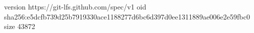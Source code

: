version https://git-lfs.github.com/spec/v1
oid sha256:e5dcfb739d25b7919330ace1188277d6bc6d397d0ee1311889ae006e2e59fbc0
size 43872
